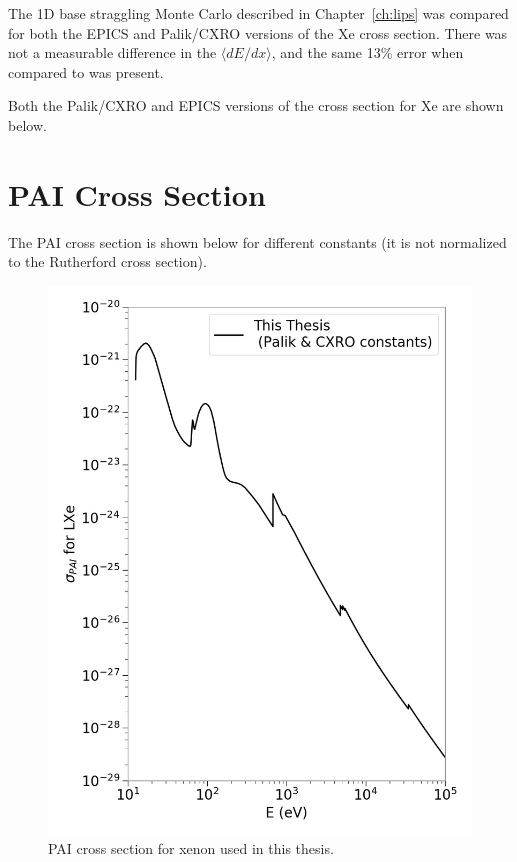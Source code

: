 The 1D base straggling Monte Carlo described in Chapter~\ref{ch:lips} was compared for both the EPICS and Palik/CXRO versions of the Xe cross section. There was not a measurable difference in the $\langle dE/dx \rangle$, and the same 13\% error when compared to \cite{PDG} was present.

Both the Palik/CXRO and EPICS versions of the cross section for Xe are shown below.

\section{PAI Cross Section}
The \ac{PAI} cross section is shown below for different constants (it is not normalized to the Rutherford cross section).


\begin{figure}[htbp]
\begin{center}
\includegraphics[width=\textwidth]{figures/app/full_fvp_xe.png}
\caption{\acs{PAI} cross section for xenon used in this thesis.  }
\label{fig:full_fvp_me}
\end{center}
\end{figure}


